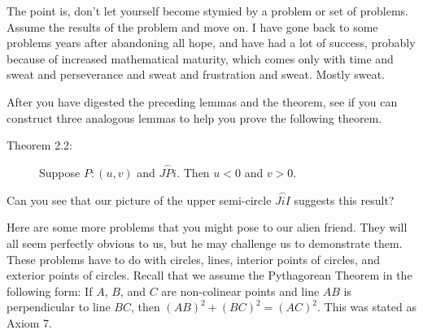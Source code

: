 \documentclass[english]{book}
\newcommand{\arc}[1]{\overset{\frown}{#1} }
\begin{document}
The point is, don't let yourself become stymied by a problem or set of problems. Assume the results of the problem and move on. I have gone back to some problems years after abandoning all hope, and have had a lot of success, probably because of increased mathematical maturity, which comes only with time and sweat and perseverance and sweat and frustration and sweat. Mostly sweat.

\vspace{0.3cm}

After you have digested the preceding lemmas and the theorem, see if you can construct three analogous lemmas to help you prove the following theorem.

\begin{description}

\item[Theorem 2.2:] Suppose $P:(u,v)$ and $\arc{JPi}$. Then $u<0$ and $v>0$.

\end{description}

Can you see that our picture of the upper semi-circle $\arc{JiI}$ suggests this result?

\vspace{0.3cm}

Here are some more problems that you might pose to our alien friend. They will all seem perfectly obvious to us, but he may challenge us to demonstrate them. These problems have to do with circles, lines, interior points of circles, and exterior points of circles. Recall that we assume the Pythagorean Theorem in the following form: If $A$, $B$, and $C$ are non-colinear points and line $AB$ is perpendicular to line $BC$, then $(AB)^{2} + (BC)^{2} = (AC)^{2}$. This was stated as Axiom 7.
\end{document}
